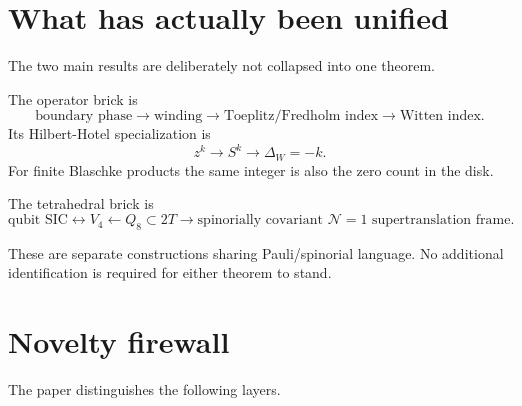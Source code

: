 \section{What has actually been unified}

The two main results are deliberately not collapsed into one theorem.

The operator brick is
\[
\boxed{
\text{boundary phase}
\longrightarrow
\text{winding}
\longrightarrow
\text{Toeplitz/Fredholm index}
\longrightarrow
\text{Witten index}.
}
\]
Its Hilbert-Hotel specialization is
\[
\boxed{
z^k\longrightarrow S^k\longrightarrow\Delta_W=-k.}
\]
For finite Blaschke products the same integer is also the zero count in the disk.

The tetrahedral brick is
\[
\boxed{
\text{qubit SIC}
\longleftrightarrow
V_4
\longleftarrow
Q_8
\subset
2T
\longrightarrow
\text{spinorially covariant }\mathcal N=1\text{ supertranslation frame}.
}
\]

These are separate constructions sharing Pauli/spinorial language. No additional identification is required for either theorem to stand.

\section{Novelty firewall}

The paper distinguishes the following layers.

